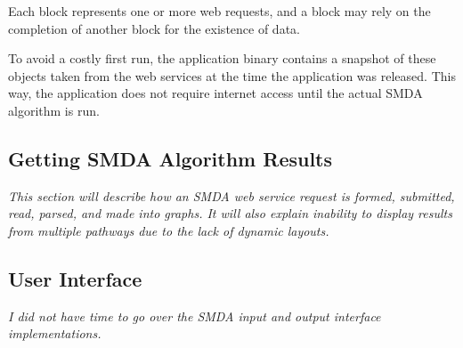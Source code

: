 Each block represents one or more web requests, and a block may rely on the
completion of another block for the existence of data.

To avoid a costly first run, the application binary contains a snapshot of these
objects taken from the web services at the time the application was released.
This way, the application does not require internet access until the actual SMDA
algorithm is run.

\subsection{Getting SMDA Algorithm Results}
\label{sect:smda_results_request}

\emph{This section will describe how an SMDA web service request is formed,
submitted, read, parsed, and made into graphs. It will also explain \mawappp
inability to display results from multiple pathways due to the lack of dynamic
layouts.}

\subsection{User Interface}
\label{sect:smda_results_ui}

\emph{I did not have time to go over the SMDA input and output interface
implementations.}
